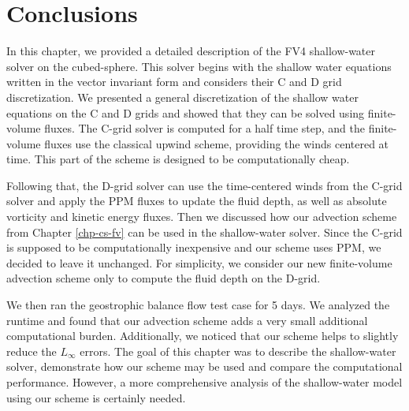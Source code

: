 \section{Conclusions}
\label{sec:conclusions}
In this chapter, we provided a detailed description of the FV4 shallow-water solver on the cubed-sphere. 
This solver begins with the shallow water equations written in the vector invariant form and considers their C and D grid discretization.
We presented a general discretization of the shallow water equations on the C and D grids and showed that they can be solved using finite-volume fluxes.
The C-grid solver is computed for a half time step, and the finite-volume fluxes use the classical upwind scheme, providing the winds centered at time.
This part of the scheme is designed to be computationally cheap.

Following that, the D-grid solver can use the time-centered winds from the C-grid solver and apply the PPM fluxes to update the fluid depth,
as well as absolute vorticity and kinetic energy fluxes. 
Then we discussed how our advection scheme from Chapter \ref{chp-cs-fv} can be used in the shallow-water solver. 
Since the C-grid is supposed to be computationally inexpensive and our scheme uses PPM, we decided to leave it unchanged. 
For simplicity, we consider our new finite-volume advection scheme only to compute the fluid depth on the D-grid.

We then ran the geostrophic balance flow test case for 5 days. 
We analyzed the runtime and found that our advection scheme adds a very small additional computational burden.
Additionally, we noticed that our scheme helps to slightly reduce the $L_{\infty}$ errors.
The goal of this chapter was to describe the shallow-water solver, demonstrate how our scheme may be used and compare the computational performance.
However, a more comprehensive analysis of the shallow-water model using our scheme is certainly needed.
